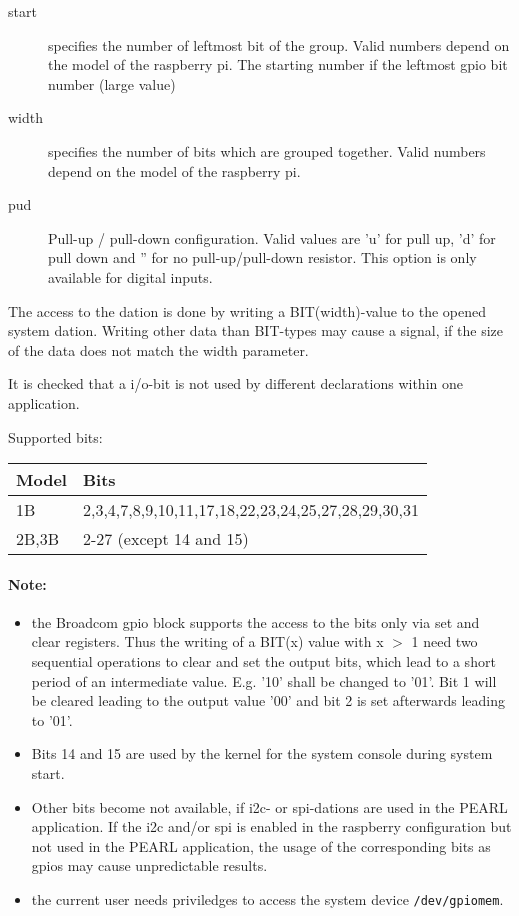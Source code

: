 \begin{description}
\item[start] specifies the number of leftmost bit of the group. Valid numbers
     depend on the model of the raspberry pi. The starting number if
     the leftmost gpio bit number (large value)
\item [width] specifies the number of bits which are grouped together.
     Valid numbers depend on the model of the raspberry pi.
\item [pud] Pull-up / pull-down configuration.
    Valid values are 'u' for pull up, 'd' for pull down and 
    '' for no pull-up/pull-down resistor. This option is only
    available for digital inputs.
\end{description}

The access to the dation is done by writing a BIT(width)-value to the
opened system dation. 
Writing other data than BIT-types  may cause a signal, if the size of the
data does not match the width parameter. 

It is checked that a i/o-bit is not used by different declarations within
one application.

Supported bits:

\begin{tabular}{|l|l|}
\hline
Model & Bits \\
\hline
1B & 2,3,4,7,8,9,10,11,17,18,22,23,24,25,27,28,29,30,31 \\
\hline
2B,3B & 2-27 (except 14 and 15) \\
\hline
\end{tabular}  

\paragraph{Note:} 
\begin{itemize}
\item the Broadcom gpio block supports the access to the bits only 
via set and clear registers. Thus the writing of a BIT(x) value with x $>$ 1
need two sequential operations to clear and set the output bits, which lead
to a short period of an intermediate value. E.g. '10' shall be changed to '01'. Bit 1 will be cleared leading to the output value '00' and bit 2 
is set afterwards leading to '01'.

\item Bits 14 and 15 are used by the kernel for the 
  system console during system start.
\item Other bits become not available, if i2c- or spi-dations are used
  in the PEARL application.  If the i2c and/or spi is enabled in the
  raspberry configuration but not used in the PEARL application,
  the usage of the corresponding bits 
  as gpios may cause unpredictable results.
\item the current user needs priviledges to access the system device 
  \verb|/dev/gpiomem|.
\end{itemize}
 
